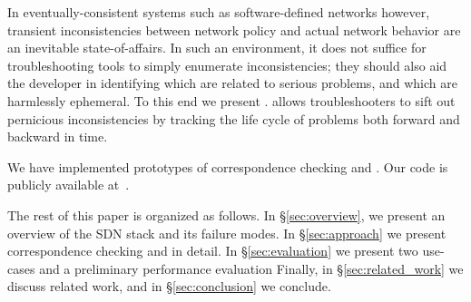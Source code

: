 In eventually-consistent systems such as software-defined
networks however, transient inconsistencies between network policy and actual network
behavior are an inevitable state-of-affairs.
In such an environment, it does not suffice for troubleshooting tools to
simply enumerate inconsistencies; they should also aid the developer
in identifying which are related to serious problems, and which are
harmlessly ephemeral. To this end we present \simulator.
\Simulator allows troubleshooters 
to sift out pernicious inconsistencies by tracking the life cycle of problems 
both forward and backward in time.

We have implemented prototypes
of correspondence checking and \simulation. Our code is publicly available
at~\cite{github}.

The rest of this paper is organized as follows. In \S\ref{sec:overview},
we present an overview of the SDN stack and its failure modes.
In \S\ref{sec:approach} we present correspondence checking and
\simulator in detail. In \S\ref{sec:evaluation} we present
two use-cases and a preliminary performance evaluation
Finally, in \S\ref{sec:related_work} we discuss related work,
and in \S\ref{sec:conclusion} we conclude.

